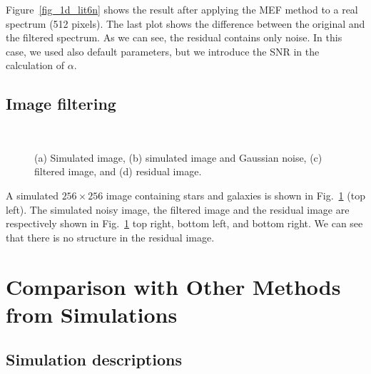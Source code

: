 Figure~\ref{fig_1d_lit6n}
shows the result after applying the MEF method to a real spectrum (512 pixels). The last
plot shows the difference between the original and the filtered spectrum.
As we can see, the residual contains only noise. In this case, we used 
also default parameters, but we introduce the SNR in the calculation
of $\alpha$.


\subsection{Image filtering}
\begin{figure}[h]
\centerline{
\hbox{
}}
\caption{(a) Simulated image, (b) simulated image and 
Gaussian noise, (c) filtered image, and (d)
residual image.}
\label{fig_filter_gauss_noise}
\end{figure}

A simulated $256 \times 256$ 
image containing stars and galaxies is shown in Fig.\ 
\ref{fig_filter_gauss_noise} (top left). The simulated noisy
image, the filtered image and the residual image are respectively shown in
Fig.\ \ref{fig_filter_gauss_noise} top right, bottom left, and
bottom right. We can see that there is no structure in the residual 
image.  

\clearpage
\newpage

\section{Comparison with Other Methods from Simulations}

\subsection{Simulation descriptions}

